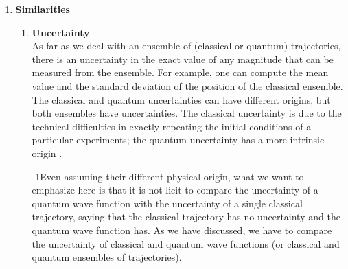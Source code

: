 \documentclass[onecolumn,nofootinbib, secnumarabic, amsmath, nobibnotes,12pt,aps,pra]{revtex4-1}
\newcommand{\fref}[1]{Fig. \ref{#1}}
\newcommand{\eref}[1]{Eq. (\ref{#1})}
\begin{document}
\begin{enumerate}
\begin{enumerate}
{\quad}This surprising result for quantum mechanics can  be
illustrated with the double-slit experiment \cite{om.Dewdney}. We  assume that the initial wave functions
for the classical and quantum ensembles are identical at $t_0 = 0$.
Their difference appears in the time evolution of the trajectories.
For the quantum trajectories of the ensemble, the shape of the
ensemble (whether particles are stopped or not by the double-slit
screen) determines the shape of $R(x,t)$, which will affect the
dynamics of all  trajectories, even those trajectories
that are far from the slit (see \fref{om_fig_dobleslit}a). On the
contrary, the classical Hamilton--Jacobi equation,
\eref{om.hamilton_jacobi1D}, is totally independent of $R(x,t)$, so
a single trajectory is completely independent from the rest of
particles (see \fref{om_fig_dobleslit}b).
\end{enumerate}
\item \textbf{Similarities}
\begin{enumerate}
\item \textbf{Uncertainty} \\ As far as we deal with an ensemble of (classical or quantum) trajectories, there is an uncertainty in the exact value of any magnitude that can be measured from the ensemble. For example, one can compute the mean value and the standard deviation of the position of the classical ensemble. The classical and quantum uncertainties can have different origins, but both ensembles have uncertainties. The classical uncertainty is due to the technical difficulties in exactly repeating the initial conditions of a particular experiments; the quantum uncertainty has a more intrinsic origin  \cite{om.extra2,om.extra9}.

{\quad}\looseness-1Even assuming their different physical origin, what we want to
emphasize here is  that it is not licit to compare the uncertainty
of a quantum wave function with the uncertainty of a single
classical trajectory, saying that the classical trajectory has no
uncertainty and the quantum wave function has. As we have discussed,
we have to compare the uncertainty of classical and quantum wave
functions (or classical and quantum ensembles of trajectories).


\end{enumerate}
\end{enumerate}
\end{document}
